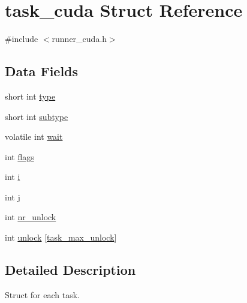 \hypertarget{structtask__cuda}{\section{task\-\_\-cuda Struct Reference}
\label{structtask__cuda}
}


{\ttfamily \#include $<$runner\-\_\-cuda.\-h$>$}

\subsection*{Data Fields}
\begin{DoxyCompactItemize}
\item 
short int \hyperlink{structtask__cuda_aaa8ba4297d83f2cce5af75b18564ae13}{type}
\item 
short int \hyperlink{structtask__cuda_af211cd3d9a83521309369c8e3f3ed87d}{subtype}
\item 
volatile int \hyperlink{structtask__cuda_aa94a6aba3d992ae3ac145f984ceb2eb9}{wait}
\item 
int \hyperlink{structtask__cuda_ac8bf36fe0577cba66bccda3a6f7e80a4}{flags}
\item 
int \hyperlink{structtask__cuda_acb559820d9ca11295b4500f179ef6392}{i}
\item 
int \hyperlink{structtask__cuda_a37d972ae0b47b9099e30983131d31916}{j}
\item 
int \hyperlink{structtask__cuda_a060ca3576648f40a2488d5b81ff5bb8e}{nr\-\_\-unlock}
\item 
int \hyperlink{structtask__cuda_a04f8c77b785d7085535af360c3b3604f}{unlock} \mbox{[}\hyperlink{task_8h_a222ad2234468d880c3d5482374d28bc3}{task\-\_\-max\-\_\-unlock}\mbox{]}
\end{DoxyCompactItemize}


\subsection{Detailed Description}
Struct for each task. 

